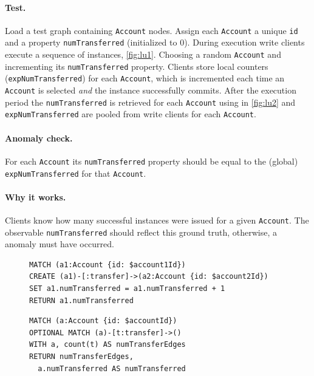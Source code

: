 \paragraph{Test.}
Load a test graph containing \texttt{Account} nodes. Assign each \texttt{Account} 
a unique \texttt{id} and a property \texttt{numTransferred} (initialized to 0).
During execution write clients execute a sequence of  
instances, \autoref{fig:lu1}. Choosing a random \texttt{Account} and incrementing 
its \texttt{numTransferred} property. Clients store local counters 
(\texttt{expNumTransferred}) for each \texttt{Account}, which is incremented 
each time an \texttt{Account} is selected \emph{and} the  
instance successfully commits. After the execution period the 
\texttt{numTransferred} is retrieved for each \texttt{Account} using 
 in \autoref{fig:lu2} and \texttt{expNumTransferred} are 
pooled from write clients for each \texttt{Account}.

\paragraph{Anomaly check.}
For each \texttt{Account} its \texttt{numTransferred} property should be equal 
to the (global) \texttt{expNumTransferred} for that \texttt{Account}.

\paragraph{Why it works.}
Clients know how many successful  instances were issued 
for a given \texttt{Account}. The observable \texttt{numTransferred} should 
reflect this ground truth, otherwise, a  anomaly must have occurred.

\begin{figure}[htb]
\centering
\begin{minipage}{0.41\linewidth}
\begin{lstlisting}[language=cypher,label=fig:lu1,caption=\tx{Lost Update $T_\mathrm{W}$}.]
MATCH (a1:Account {id: $account1Id})
CREATE (a1)-[:transfer]->(a2:Account {id: $account2Id})
SET a1.numTransferred = a1.numTransferred + 1
RETURN a1.numTransferred
\end{lstlisting}
\end{minipage}
\quad
\begin{minipage}{0.52\linewidth}
\begin{lstlisting}[language=cypher,label=fig:lu2,caption=\tx{Lost Update $T_\mathrm{R}$}.]
MATCH (a:Account {id: $accountId})
OPTIONAL MATCH (a)-[t:transfer]->()
WITH a, count(t) AS numTransferEdges
RETURN numTransferEdges,
  a.numTransferred AS numTransferred
\end{lstlisting}
\end{minipage}
\end{figure}

